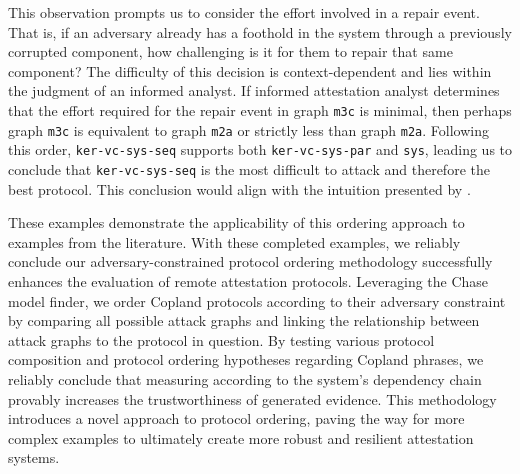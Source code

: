 \documentclass[runningheads]{llncs}
\theoremstyle{definition}
\begin{document}
This observation prompts us to consider the effort involved in a repair event. That is, if an adversary already has a foothold in the system through a previously corrupted component, how challenging is it for them to repair that same component? The difficulty of this decision is context-dependent and lies within the judgment of an informed analyst. If informed attestation analyst determines that the effort required for the repair event in graph \texttt{m3c} is minimal, then perhaps graph \texttt{m3c} is equivalent to graph \texttt{m2a} or strictly less than graph \texttt{m2a}. Following this order, \texttt{ker-vc-sys-seq} supports both \texttt{ker-vc-sys-par} and \texttt{sys}, leading us to conclude that \texttt{ker-vc-sys-seq} is the most difficult to attack and therefore the best protocol. This conclusion would align with the intuition presented by \citet{Rowe:2021:AutomatedTrust}.


These examples demonstrate the applicability of this ordering approach to examples from the literature. With these completed examples, we reliably conclude our adversary-constrained protocol ordering methodology successfully enhances the evaluation of remote attestation protocols. Leveraging the Chase model finder, we order Copland protocols according to their adversary constraint by comparing all possible attack graphs and linking the relationship between attack graphs to the protocol in question. By testing various protocol composition and protocol ordering hypotheses regarding Copland phrases, we reliably conclude that measuring according to the system's dependency chain provably increases the trustworthiness of generated evidence. This methodology introduces a novel approach to protocol ordering, paving the way for more complex examples to ultimately create more robust and resilient attestation systems.





%
% 
%
%
%

%

%
\end{document}
